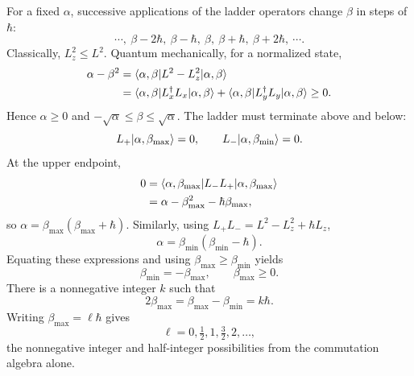 For a fixed $\alpha$, successive applications of the ladder operators
change $\beta$ in steps of $\hbar$:
\[
 \cdots,\ \beta-2\hbar,\ \beta-\hbar,\ \beta,\
 \beta+\hbar,\ \beta+2\hbar,\ \cdots.
\]
Classically, $L_z^2\le L^2$. Quantum mechanically, for a normalized state,
\begin{align*}
 \alpha-\beta^2
 &=\langle \alpha,\beta\rvert L^2-L_z^2\lvert \alpha,\beta\rangle\\
 &=\langle \alpha,\beta\rvert L_x^\dagger L_x\lvert \alpha,\beta\rangle
  +\langle \alpha,\beta\rvert L_y^\dagger L_y\lvert \alpha,\beta\rangle\ge0.
\end{align*}
Hence $\alpha\ge0$ and $-\sqrt\alpha\le\beta\le\sqrt\alpha$.
The ladder must terminate above and below:
\[
 L_+\lvert \alpha,\beta_{\max}\rangle=0,\qquad
 L_-\lvert \alpha,\beta_{\min}\rangle=0.
\]
At the upper endpoint,
\begin{align*}
 0&=\langle \alpha,\beta_{\max}\rvert L_-L_+\lvert \alpha,\beta_{\max}\rangle\\
  &=\alpha-\beta_{\max}^2-\hbar\beta_{\max},
\end{align*}
so $\alpha=\beta_{\max}(\beta_{\max}+\hbar)$.
Similarly, using $L_+L_-=L^2-L_z^2+\hbar L_z$,
\[
 \alpha=\beta_{\min}(\beta_{\min}-\hbar).
\]
Equating these expressions and using $\beta_{\max}\ge\beta_{\min}$ yields
\[
 \beta_{\min}=-\beta_{\max},\qquad\beta_{\max}\ge0.
\]
There is a nonnegative integer $k$ such that
\[
 2\beta_{\max}=\beta_{\max}-\beta_{\min}=k\hbar.
\]
Writing $\beta_{\max}=\ell\hbar$ gives
\[
 \ell=0,\tfrac12,1,\tfrac32,2,\ldots,
\]
the nonnegative integer and half-integer possibilities from the
commutation algebra alone.

\begin{center}
\end{center}
